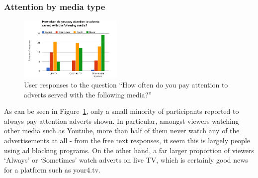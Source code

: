 \subsubsection{Attention by media type}
\begin{figure}
	\vspace{-10pt}
	\includegraphics[width=0.44\textwidth]{images/prestudy_media.png}
	\caption{User responses to the question ``How often do you pay attention to adverts served with the following media?''}
	\label{fig:prestudy_media}
	\vspace{-15pt}
\end{figure}
As can be seen in Figure~\ref{fig:prestudy_media}, only a small minority of participants reported to always pay attention adverts shown. In particular, amongst viewers watching other media such as Youtube, more than half of them never watch any of the advertisements at all - from the free text responses, it seem this is largely people using ad blocking programs. On the other hand, a far larger proportion of viewers `Always' or `Sometimes' watch adverts on live TV, which is certainly good news for a platform such as your4.tv.

